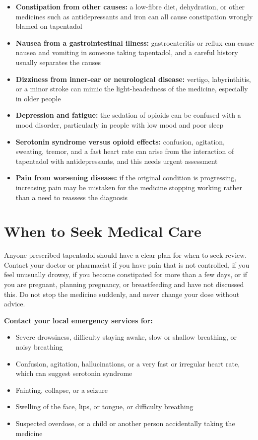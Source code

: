 \begin{itemize}
    \item \textbf{Constipation from other causes:} a low-fibre diet, dehydration, or other medicines such as antidepressants and iron can all cause constipation wrongly blamed on tapentadol
    \item \textbf{Nausea from a gastrointestinal illness:} gastroenteritis or reflux can cause nausea and vomiting in someone taking tapentadol, and a careful history usually separates the causes
    \item \textbf{Dizziness from inner-ear or neurological disease:} vertigo, labyrinthitis, or a minor stroke can mimic the light-headedness of the medicine, especially in older people
    \item \textbf{Depression and fatigue:} the sedation of opioids can be confused with a mood disorder, particularly in people with low mood and poor sleep
    \item \textbf{Serotonin syndrome versus opioid effects:} confusion, agitation, sweating, tremor, and a fast heart rate can arise from the interaction of tapentadol with antidepressants, and this needs urgent assessment
    \item \textbf{Pain from worsening disease:} if the original condition is progressing, increasing pain may be mistaken for the medicine stopping working rather than a need to reassess the diagnosis
\end{itemize}

\section*{When to Seek Medical Care}
Anyone prescribed tapentadol should have a clear plan for when to seek review. Contact your doctor or pharmacist if you have pain that is not controlled, if you feel unusually drowsy, if you become constipated for more than a few days, or if you are pregnant, planning pregnancy, or breastfeeding and have not discussed this. Do not stop the medicine suddenly, and never change your dose without advice.

\textbf{Contact your local emergency services for:}
\begin{itemize}
    \item Severe drowsiness, difficulty staying awake, slow or shallow breathing, or noisy breathing
    \item Confusion, agitation, hallucinations, or a very fast or irregular heart rate, which can suggest serotonin syndrome
    \item Fainting, collapse, or a seizure
    \item Swelling of the face, lips, or tongue, or difficulty breathing
    \item Suspected overdose, or a child or another person accidentally taking the medicine
\end{itemize}

